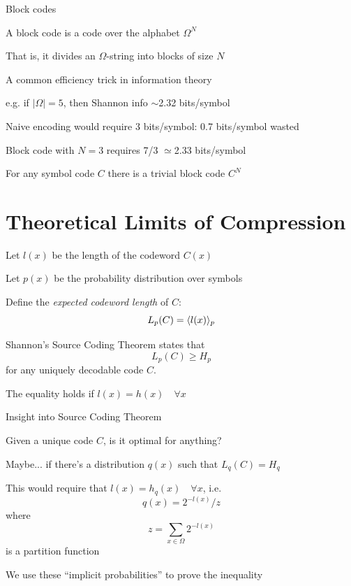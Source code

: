 \documentclass{beamer}
\begin{document}
\begin{frame}{Block codes}

\itemb
\item A \alert{block code} is a code over the alphabet $\Omega^N$
\item That is, it divides an $\Omega$-string into blocks of size $N$
\item A common efficiency trick in information theory
 \itemb
 \item e.g. if $|\Omega|=5$, then Shannon info $\sim$2.32 bits/symbol
 \item Naive encoding would require 3 bits/symbol: 0.7 bits/symbol wasted
 \item Block code with $N=3$ requires 7/3 $\simeq$2.33 bits/symbol
 \iteme
\item For any symbol code $C$ there is a trivial block code $C^N$
\iteme

\end{frame}

\section{Theoretical Limits of Compression}

\begin{frame}

\itemb
\item Let $l(x)$ be the length of the codeword $C(x)$
\item Let $p(x)$ be the probability distribution over symbols
\item Define the {\em expected codeword length} of $C$:
\[
L_p(C) = \langle l(x) \rangle_p
\]
\item \alert{Shannon's Source Coding Theorem} states that
\[
L_p(C) \geq H_p
\]
for any uniquely decodable code $C$.
\item The equality holds if $l(x) = h(x) \quad \forall x$
\iteme

\end{frame}

\begin{frame}{Insight into Source Coding Theorem}

\itemb
\item Given a unique code $C$, is it optimal for anything?
\item Maybe... if there's a distribution $q(x)$ such that $L_q(C) = H_q$
\item This would require that $l(x) = h_q(x) \quad \forall x$, i.e.
\[
q(x) = 2^{-l(x)} / z
\]
where
\[
z = \sum_{x \in {\Omega}} 2^{-l(x)}
\]
is a \alert{partition function}
\item We use these ``implicit probabilities'' to prove the inequality
\iteme

\end{frame}
\end{document}
